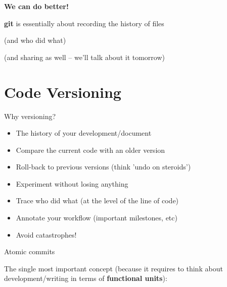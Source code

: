 \documentclass[compress]{beamer}
\begin{document}
\begin{frame}{}
    \begin{center}
        \textbf{We can do better!}
    \end{center}
    \pause

    \textbf{git} is essentially about recording the history of files
    \pause

    (and who did what)
    \pause

    (and sharing as well -- we'll talk about it tomorrow)
\end{frame}

\section{Code Versioning}

\begin{frame}[label=codeversioning]{Why versioning?}

    \begin{itemize}
        \item The history of your development/document
        \item Compare the current code with an older version
        \item Roll-back to previous versions (think 'undo on steroids')
        \item Experiment without losing anything
        \item Trace who did what (at the level of the line of code)
        \item Annotate your workflow (important milestones, etc)
        \item Avoid catastrophes!
    \end{itemize}
\end{frame}

\begin{frame}{Atomic commits}

    The single most important concept (because it requires to think about
    development/writing in terms of {\bf functional units}):



\end{frame}
\end{document}
